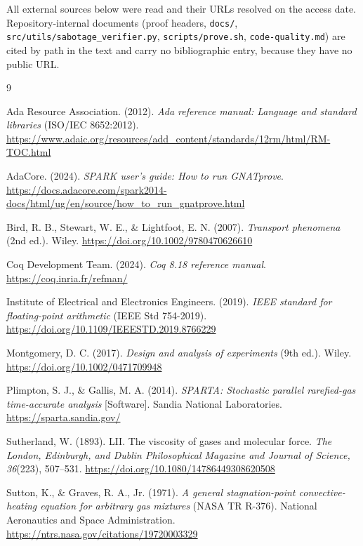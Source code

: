 \documentclass[11pt]{article}
\theoremstyle{definition}
\begin{document}
All external sources below were read and their URLs resolved on the access
date. Repository-internal documents (proof headers, \texttt{docs/},
\texttt{src/utils/sabotage\_verifier.py}, \texttt{scripts/prove.sh},
\texttt{code-quality.md}) are cited by path in the text and carry no
bibliographic entry, because they have no public URL.

\begin{thebibliography}{9}

 Ada Resource Association. (2012). \emph{Ada reference
manual: Language and standard libraries} (ISO/IEC 8652:2012).
\url{https://www.adaic.org/resources/add_content/standards/12rm/html/RM-TOC.html}

 AdaCore. (2024). \emph{SPARK user's guide: How to run
GNATprove}. \url{https://docs.adacore.com/spark2014-docs/html/ug/en/source/how_to_run_gnatprove.html}

 Bird, R. B., Stewart, W. E., \& Lightfoot, E. N. (2007).
\emph{Transport phenomena} (2nd ed.). Wiley.
\url{https://doi.org/10.1002/9780470626610}

 Coq Development Team. (2024). \emph{Coq 8.18 reference
manual}. \url{https://coq.inria.fr/refman/}

 Institute of Electrical and Electronics Engineers.
(2019). \emph{IEEE standard for floating-point arithmetic}
(IEEE Std 754-2019). \url{https://doi.org/10.1109/IEEESTD.2019.8766229}

 Montgomery, D. C. (2017). \emph{Design and
analysis of experiments} (9th ed.). Wiley.
\url{https://doi.org/10.1002/0471709948}

 Plimpton, S. J., \& Gallis, M. A. (2014).
\emph{SPARTA: Stochastic parallel rarefied-gas time-accurate analysis}
[Software]. Sandia National Laboratories. \url{https://sparta.sandia.gov/}

 Sutherland, W. (1893). LII. The viscosity of gases
and molecular force. \emph{The London, Edinburgh, and Dublin Philosophical
Magazine and Journal of Science, 36}(223), 507--531.
\url{https://doi.org/10.1080/14786449308620508}

 Sutton, K., \& Graves, R. A., Jr. (1971). \emph{A
general stagnation-point convective-heating equation for arbitrary gas
mixtures} (NASA TR R-376). National Aeronautics and Space Administration.
\url{https://ntrs.nasa.gov/citations/19720003329}

\end{thebibliography}
\end{document}
